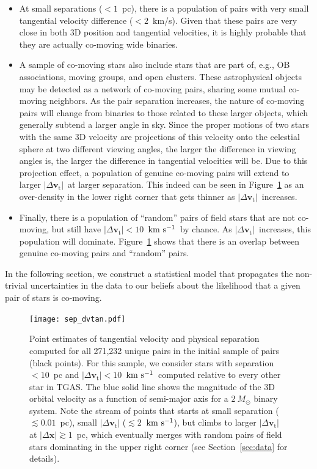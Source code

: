 \documentclass[manuscript, letterpaper]{aastex6}
\newcommand{\acronym}[1]{{\small{#1}}}
\newcommand{\sectionname}{Section}
\newcommand{\tgas}{\acronym{TGAS}}
\newcommand{\bs}[1]{\boldsymbol{#1}}
\renewcommand{\vec}[1]{\bs{#1}}
\newcommand{\kms}{\ensuremath{\rm km~s^{-1}}}
\newcommand{\absdvtan}{\ensuremath{|\Delta\vec v_\mathrm{t}|}}
\begin{document}
\begin{itemize}
  \item At small separations ($<1$~pc), there is a population of pairs with
    very small tangential velocity difference ($<2$~km/s). Given that these
    pairs are very close in both 3D position and tangential velocities, it is highly
    probable that they are actually co-moving wide binaries.

  \item  A sample of co-moving stars also include stars that are part of, e.g.,
    OB associations, moving groups, and open clusters.
    These astrophysical objects may be detected as a network of co-moving pairs,
    sharing some mutual co-moving neighbors.
    As the pair separation increases, the nature of co-moving pairs
    will change from binaries to those related to these larger objects,
    which generally subtend a larger angle in sky.
    Since the proper motions of two stars with the same 3D velocity
    are projections of this velocity onto the celestial sphere at
    two different viewing angles,
    the larger the difference in viewing angles is, the larger the difference in tangential
    velocities will be.
    Due to this projection effect, a population of genuine co-moving pairs
    will extend to larger \absdvtan\ at larger separation.
    This indeed can be seen in Figure~\ref{fig:dv-sep} as an over-density
    in the lower right corner that gets thinner as \absdvtan\ increases.

  \item Finally, there is a population of ``random'' pairs of field stars
    that are not co-moving, but still have $\absdvtan < 10$~\kms\
    by chance.
    As \absdvtan\ increases, this population will dominate.
    Figure~\ref{fig:dv-sep} shows that there is an overlap between
    genuine co-moving pairs and ``random'' pairs.
\end{itemize}

In the following section, we construct a statistical model that propagates
the non-trivial uncertainties in the data to our beliefs about the likelihood
that a given pair of stars is co-moving.

\begin{figure}[htbp]
  \begin{center}
    \texttt{[image: sep\_dvtan.pdf]}
  \end{center}
  \caption{%
    Point estimates of tangential velocity and physical separation computed for
    all 271,232 unique pairs in the initial sample of pairs (black points).
    For this sample, we consider stars
    with separation $< 10$~pc and $\absdvtan < 10$~\kms\
    computed relative to every other star in \tgas.
    The blue solid line shows the magnitude of the 3D
    orbital velocity as a function of semi-major axis for a $2~M_\odot$ binary system.
    Note the stream of points that starts at small separation ($\lesssim 0.01$~pc),
    small $\absdvtan$ ($\lesssim 2$~\kms),
    but climbs to larger $\absdvtan$ at $|\Delta \vec{x}|\gtrsim 1$~pc, which
    eventually merges with random pairs of field stars dominating in the upper right corner
    (see \sectionname~\ref{sec:data} for details).
    \label{fig:dv-sep}}
\end{figure}
\end{document}
